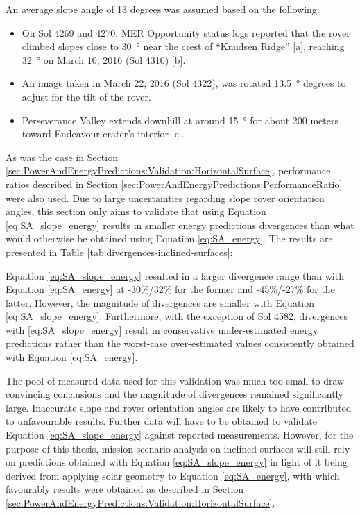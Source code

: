 An average slope angle of 13 degrees was assumed based on the following:
\begin{itemize}
  \item On Sol 4269 and 4270, MER Opportunity status logs reported that the rover climbed slopes close to \SI{30}{\degree} near the crest of ``Knudsen Ridge'' [a], reaching \SI{32}{\degree} on March 10, 2016 (Sol 4310) [b].
  \item An image taken in March 22, 2016 (Sol 4322), was rotated \SI{13.5}{\degree} degrees to adjust for the tilt of the rover.
  \item Perseverance Valley extends downhill at around \SI{15}{\degree} for about 200 meters toward Endeavour crater's interior [c].
\end{itemize}

As was the case in Section \ref{sec:PowerAndEnergyPredictions:Validation:HorizontalSurface}, performance ratios described in Section \ref{sec:PowerAndEnergyPredictions:PerformanceRatio} were also used. Due to large uncertainties regarding slope rover orientation angles, this section only aims to validate that using Equation \ref{eq:SA_slope_energy} results in smaller energy predictions divergences than what would otherwise be obtained using Equation \ref{eq:SA_energy}. The results are presented in Table \ref{tab:divergences-inclined-surfaces}:



Equation \ref{eq:SA_slope_energy} resulted in a larger divergence range than with Equation \ref{eq:SA_energy} at -30\%/32\% for the former and -45\%/-27\% for the latter. However, the magnitude of divergences are smaller with Equation \ref{eq:SA_slope_energy}. Furthermore, with the exception of Sol 4582, divergences with \ref{eq:SA_slope_energy} result in conservative under-estimated energy predictions rather than the worst-case over-estimated values consistently obtained with Equation \ref{eq:SA_energy}.

The pool of measured data used for this validation was much too small to draw convincing conclusions and the magnitude of divergences remained significantly large. Inaccurate slope and rover orientation angles are likely to have contributed to unfavourable results. Further data will have to be obtained to validate Equation \ref{eq:SA_slope_energy} against reported measurements. However, for the purpose of this thesis, mission scenario analysis on inclined surfaces will still rely on predictions obtained with Equation \ref{eq:SA_slope_energy} in light of it being derived from applying solar geometry to Equation \ref{eq:SA_energy}, with which favourably results were obtained as described in Section \ref{sec:PowerAndEnergyPredictions:Validation:HorizontalSurface}.

